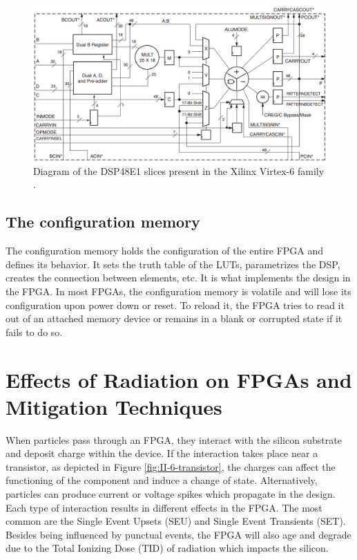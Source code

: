       \begin{figure}[h!]
        \centering
        \includegraphics[width=\textwidth]{img/II-6-irradiation/dsp.png}
        \caption{Diagram of the DSP48E1 slices present in the Xilinx Virtex-6 family \cite{VIRTEX-DSP}.}
        \label{fig:II-6-dsp}
      \end{figure}

    \subsection{The configuration memory}

      The configuration memory holds the configuration of the entire FPGA and defines its behavior. It sets the truth table of the LUTs, parametrizes the DSP, creates the connection between elements, etc. It is what implements the design in the FPGA. In most FPGAs, the configuration memory is volatile and will lose its configuration upon power down or reset. To reload it, the FPGA tries to read it out of an attached memory device or remains in a blank or corrupted state if it fails to do so.

  \section{Effects of Radiation on FPGAs and Mitigation Techniques}

    When particles pass through an FPGA, they interact with the silicon substrate and deposit charge within the device. If the interaction takes place near a transistor, as depicted in Figure \ref{fig:II-6-transistor}, the charges can affect the functioning of the component and induce a change of state. Alternatively, particles can produce current or voltage spikes which propagate in the design. Each type of interaction results in different effects in the FPGA. The most common are the Single Event Upsets (SEU) and Single Event Transients (SET). Besides being influenced by punctual events, the FPGA will also age and degrade due to the Total Ionizing Dose (TID) of radiation which impacts the silicon.

